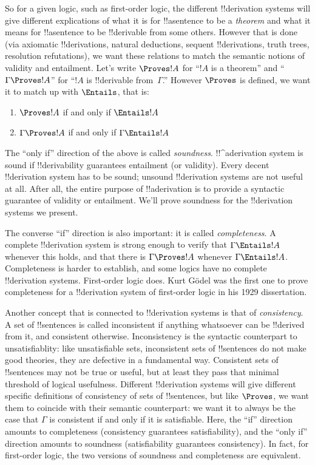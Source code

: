 \documentclass[../../../include/open-logic-section]{subfiles}
\begin{document}
So for a given logic, such as first-order logic, the different
!!{derivation} systems will give different explications of what it is
for !!a{sentence} to be a \emph{theorem} and what it means for
!!a{sentence} to be !!{derivable} from some others. However that is
done (via axiomatic !!{derivation}s, natural deductions, sequent
!!{derivation}s, truth trees, resolution refutations), we want these
relations to match the semantic notions of validity and
entailment. Let's write $\Proves !A$ for ``$!A$ is a theorem'' and
``$\Gamma \Proves !A$'' for ``$!A$ is !!{derivable} from~$\Gamma$.''
However $\Proves$ is defined, we want it to match up with $\Entails$,
that is:
\begin{enumerate}
\item $\Proves !A$ if and only if $\Entails !A$
\item $\Gamma \Proves !A$ if and only if $\Gamma \Entails !A$
\end{enumerate}
The ``only if'' direction of the above is called
\emph{soundness}. !!^a{derivation} system is sound if !!{derivability}
guarantees entailment (or validity). Every decent !!{derivation}
system has to be sound; unsound !!{derivation} systems are not useful
at all. After all, the entire purpose of !!a{derivation} is to provide
a syntactic guarantee of validity or entailment. We'll prove soundness
for the !!{derivation} systems we present.

The converse ``if'' direction is also important: it is called
\emph{completeness}. A complete !!{derivation} system is strong enough
to verify that $\Gamma \Entails !A$ whenever this holds, and that
there is $\Gamma \Proves !A$ whenever $\Gamma \Entails !A$.
Completeness is harder to establish, and some logics have no complete
!!{derivation} systems. First-order logic does. Kurt G\"odel was the
first one to prove completeness for a !!{derivation} system of
first-order logic in his 1929 dissertation.

Another concept that is connected to !!{derivation} systems is that of
\emph{consistency}. A set of !!{sentence}s is called inconsistent if
anything whatsoever can be !!{derive}d from it, and consistent
otherwise.  Inconsistency is the syntactic counterpart to
unsatisfiablity: like unsatisfiable sets, inconsistent sets of
!!{sentence}s do not make good theories, they are defective in a
fundamental way. Consistent sets of !!{sentence}s may not be true or
useful, but at least they pass that minimal threshold of logical
usefulness.  Different !!{derivation} systems will give different
specific definitions of consistency of sets of !!{sentence}s, but like
$\Proves$, we want them to coincide with their semantic counterpart:
we want it to always be the case that $\Gamma$ is consistent if and
only if it is satisfiable. Here, the ``if'' direction amounts to
completeness (consistency guarantees satisfiability), and the ``only
if'' direction amounts to soundness (satisfiability guarantees
consistency).  In fact, for first-order logic, the two versions of
soundness and completeness are equivalent.
\end{document}
